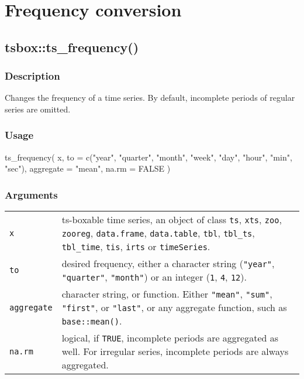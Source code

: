 \documentclass[
  letterpaper,
  DIV=11,
  numbers=noendperiod]{scrreport}
\newenvironment{Shaded}{\begin{snugshade}}{\end{snugshade}}
\newcommand{\AttributeTok}[1]{\textcolor[rgb]{0.40,0.45,0.13}{#1}}
\newcommand{\ConstantTok}[1]{\textcolor[rgb]{0.56,0.35,0.01}{#1}}
\newcommand{\FunctionTok}[1]{\textcolor[rgb]{0.28,0.35,0.67}{#1}}
\newcommand{\NormalTok}[1]{\textcolor[rgb]{0.00,0.23,0.31}{#1}}
\newcommand{\StringTok}[1]{\textcolor[rgb]{0.13,0.47,0.30}{#1}}
\begin{document}
\section{Frequency conversion}\label{frequency-conversion}

\subsection{tsbox::ts\_frequency()}\label{tsboxts_frequency}

\subsubsection{Description}\label{description-25}

Changes the frequency of a time series. By default, incomplete periods
of regular series are omitted.

\subsubsection{Usage}\label{usage-25}

\begin{Shaded}
\begin{Highlighting}[]
\FunctionTok{ts\_frequency}\NormalTok{(}
\NormalTok{  x,}
  \AttributeTok{to =} \FunctionTok{c}\NormalTok{(}\StringTok{"year"}\NormalTok{, }\StringTok{"quarter"}\NormalTok{, }\StringTok{"month"}\NormalTok{, }\StringTok{"week"}\NormalTok{, }\StringTok{"day"}\NormalTok{, }\StringTok{"hour"}\NormalTok{, }\StringTok{"min"}\NormalTok{, }\StringTok{"sec"}\NormalTok{),}
  \AttributeTok{aggregate =} \StringTok{"mean"}\NormalTok{,}
  \AttributeTok{na.rm =} \ConstantTok{FALSE}
\NormalTok{)}
\end{Highlighting}
\end{Shaded}

\subsubsection{Arguments}\label{arguments-25}

\begin{longtable}[]{@{}ll@{}}
\toprule\noalign{}
\endhead
\bottomrule\noalign{}
\endlastfoot
\texttt{x} & ts-boxable time series, an object of class \texttt{ts},
\texttt{xts}, \texttt{zoo}, \texttt{zooreg}, \texttt{data.frame},
\texttt{data.table}, \texttt{tbl}, \texttt{tbl\_ts}, \texttt{tbl\_time},
\texttt{tis}, \texttt{irts} or \texttt{timeSeries}. \\
\texttt{to} & desired frequency, either a character string
(\texttt{"year"}, \texttt{"quarter"}, \texttt{"month"}) or an integer
(\texttt{1}, \texttt{4}, \texttt{12}). \\
\texttt{aggregate} & character string, or function. Either
\texttt{"mean"}, \texttt{"sum"}, \texttt{"first"}, or \texttt{"last"},
or any aggregate function, such as \texttt{base::mean()}. \\
\texttt{na.rm} & logical, if \texttt{TRUE}, incomplete periods are
aggregated as well. For irregular series, incomplete periods are always
aggregated. \\
\end{longtable}
\end{document}
